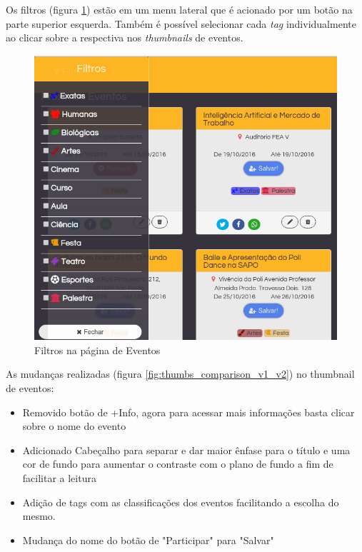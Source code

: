 \par Os filtros (figura \ref{fig:events_pagev2_filters}) estão em um menu lateral que é acionado por um botão na parte superior esquerda. Também é possível selecionar cada \emph{tag} individualmente ao clicar sobre a respectiva nos \emph{thumbnails} de eventos.
        \begin{figure}[htb]
		\includegraphics[width=15cm]{figuras/events_pagev2_filters}
		\caption{\label{fig:events_pagev2_filters} Filtros na página de Eventos}
		\end{figure}
As mudanças realizadas (figura \ref{fig:thumbs_comparison_v1_v2}) no thumbnail de eventos:
\begin{itemize}
\item Removido botão de +Info, agora para acessar mais informações basta clicar sobre o nome do evento
\item Adicionado Cabeçalho para separar e dar maior ênfase para o título e uma cor de fundo para aumentar o contraste com o plano de fundo a fim de facilitar a leitura
\item Adição de tags com as classificações dos eventos facilitando a escolha do mesmo.
\item Mudança do nome do botão de "Participar" para "Salvar"
\end{itemize}
